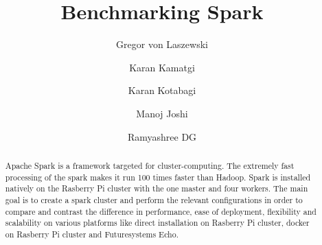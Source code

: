 \title{Benchmarking Spark}

\author{Gregor von Laszewski}

\author{Karan Kamatgi}

\author{Karan Kotabagi}

\author{Manoj Joshi}

\author{Ramyashree DG}

\renewcommand{\shortauthors}{G. v. Laszewski, Karan Kamatgi, 
	Karan Kotabagi, Manoj Joshi, Ramyashree DG}


\begin{abstract}
Apache Spark is a framework targeted for cluster-computing. 
The extremely fast processing of the spark makes it run 100 times
faster than Hadoop. Spark is installed natively on the 
Rasberry Pi cluster with the one master and four workers. 
The main goal is to create a spark cluster and perform the 
relevant configurations in order to compare and contrast 
the difference in performance, ease of deployment, flexibility 
and scalability on various platforms like direct installation 
on Rasberry Pi cluster, docker on Rasberry Pi 
cluster and Futuresystems Echo.
\end{abstract}


\maketitle

